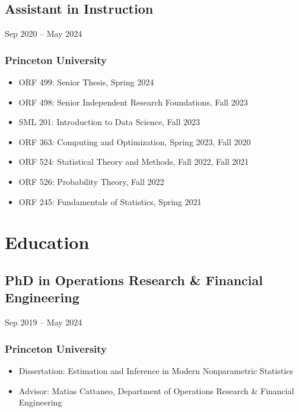 \documentclass{wgu-cv}
\begin{document}
\subsection{Assistant in Instruction}
{Sep 2020 -- May 2024}
\subsubsection{Princeton University}

\begin{itemize}

  \item
    ORF 499:
    Senior Thesis,
    Spring 2024

  \item
    ORF 498:
    Senior Independent Research Foundations,
    Fall 2023

  \item
    SML 201:
    Introduction to Data Science,
    Fall 2023

  \item
    ORF 363:
    Computing and Optimization,
    Spring 2023, Fall 2020

  \item
    ORF 524:
    Statistical Theory and Methods,
    Fall 2022, Fall 2021

  \item
    ORF 526:
    Probability Theory,
    Fall 2022

  \item
    ORF 245:
    Fundamentals of Statistics,
    Spring 2021

\end{itemize}

\vspace*{3mm}
\section{Education}

\subsection{PhD in Operations Research \& Financial Engineering}
{Sep 2019 -- May 2024}
\subsubsection{Princeton University}

\begin{itemize}
  \item Dissertation:
    Estimation and Inference in Modern Nonparametric Statistics
  \item Advisor:
    Matias Cattaneo, Department of Operations Research \& Financial Engineering
\end{itemize}
\end{document}
